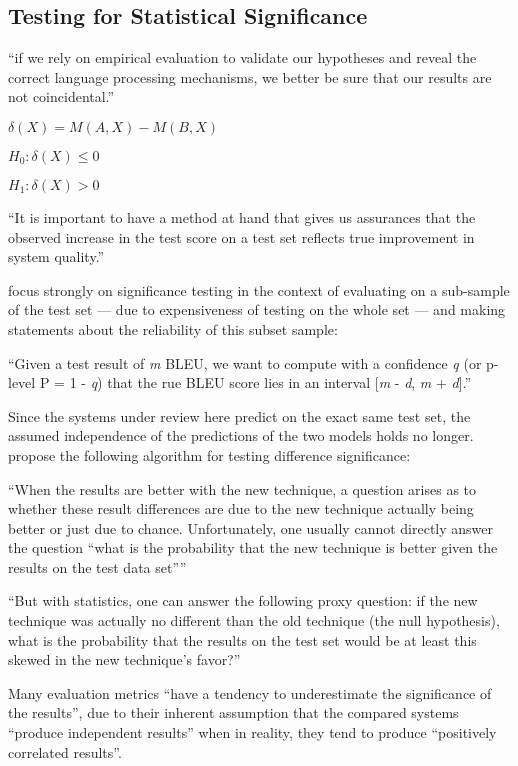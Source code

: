 \subsection{Testing for Statistical Significance}

``if we rely on empirical evaluation to validate our hypotheses and reveal the correct language processing mechanisms, we better be sure that our results are not coincidental.'' \citep{dror2018hitchhiker}


$\delta(X) = M(A, X) - M(B, X)$

$H_0:\delta(X) \leq 0$

$H_1:\delta(X) > 0$

``It is important to have a method at hand that gives us assurances that the
observed increase in the test score on a test set reflects true improvement in system
quality.'' \citep{koehn2004statistical}

\citet{koehn2004statistical} focus strongly on significance testing in the context of evaluating
on a sub-sample of the test set --- due to expensiveness of testing on the whole set ---
and making statements about the reliability of this subset sample:

``Given a test result of \emph{m} BLEU, we want to compute with a confidence \emph{q} (or
p-level P = 1 - \emph{q}) that the rue BLEU score lies in an interval [\emph{m} - \emph{d},
\emph{m} + \emph{d}].'' \citep{koehn2004statistical}

Since the systems under review here predict on the exact same test set, the assumed independence
of the predictions of the two models holds no longer. \citet{morgan2005statistical} propose
the following algorithm for testing difference significance:

``When the results are better with the new technique, a question arises as to whether
these result differences are due to the new technique actually being better or just due to
chance. Unfortunately, one usually cannot directly answer the question “what is the probability
that the new technique is better given the results on the test data set”'' \citep{yeh2000more}

``But with statistics, one can answer the following proxy question: if the new technique was
actually no different than the old technique (the null hypothesis), what is the probability
that the results on the test set would be at least this skewed in the new technique’s
favor?'' \citep{yeh2000more}

Many evaluation metrics ``have a tendency to underestimate the significance of the results'',
due to their inherent assumption that the compared systems ``produce independent results''
when in reality, they tend to produce ``positively correlated results''. \citep{yeh2000more}


